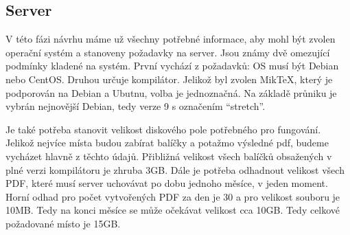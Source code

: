 \subsection{Server}
V této fázi návrhu máme už všechny potřebné informace, aby mohl být zvolen operační systém a stanoveny požadavky na server. Jsou známy dvě omezující podmínky kladené na systém. První vychází z požadavků: OS musí být Debian nebo CentOS. Druhou určuje kompilátor. Jelikož byl zvolen MikTeX, který je podporován na Debian a Ubutnu, volba je jednoznačná. Na základě průniku je vybrán nejnovější Debian, tedy verze 9 s označením \enquote{stretch}. 
\par
Je také potřeba stanovit velikost diskového pole potřebného pro fungování. Jelikož nejvíce místa budou zabírat balíčky a potažmo výsledné pdf, budeme vycházet hlavně z těchto údajů. Přibližná velikost všech balíčků obsažených v plné verzi kompilátoru je zhruba 3GB. Dále je potřeba odhadnout velikost všech PDF, které musí server uchovávat po dobu jednoho měsíce, v jeden moment. Horní odhad pro počet vytvořených PDF za den je 30 a pro velikost souboru je 10MB. Tedy na konci měsíce se může očekávat velikost cca 10GB. Tedy celkové požadované místo je 15GB.  
 




